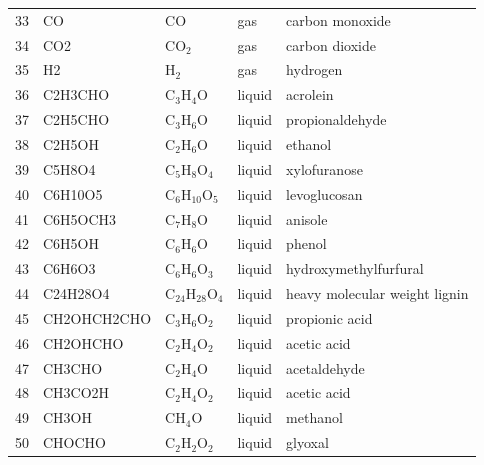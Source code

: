 \begin{center}
\begin{longtable}{cllll}
        33 & CO             & CO                      & \cellcolor{purple!25}gas         & carbon monoxide \\
        34 & CO2            & CO$_2$                  & \cellcolor{purple!25}gas         & carbon dioxide \\
        35 & H2             & H$_2$                   & \cellcolor{purple!25}gas         & hydrogen \\
        36 & C2H3CHO        & C$_3$H$_4$O             & \cellcolor{blue!25}liquid        & acrolein \\
        37 & C2H5CHO        & C$_3$H$_6$O             & \cellcolor{blue!25}liquid        & propionaldehyde \\
        38 & C2H5OH         & C$_2$H$_6$O             & \cellcolor{blue!25}liquid        & ethanol \\
        39 & C5H8O4         & C$_5$H$_8$O$_4$         & \cellcolor{blue!25}liquid        & xylofuranose \\
        40 & C6H10O5        & C$_6$H$_{10}$O$_5$      & \cellcolor{blue!25}liquid        & levoglucosan \\
        41 & C6H5OCH3       & C$_7$H$_8$O             & \cellcolor{blue!25}liquid        & anisole \\
        42 & C6H5OH         & C$_6$H$_6$O             & \cellcolor{blue!25}liquid        & phenol \\
        43 & C6H6O3         & C$_6$H$_6$O$_3$         & \cellcolor{blue!25}liquid        & hydroxymethylfurfural \\
        44 & C24H28O4       & C$_{24}$H$_{28}$O$_4$   & \cellcolor{blue!25}liquid        & heavy molecular weight lignin \\
        45 & CH2OHCH2CHO    & C$_3$H$_6$O$_2$         & \cellcolor{blue!25}liquid        & propionic acid \\
        46 & CH2OHCHO       & C$_2$H$_4$O$_2$         & \cellcolor{blue!25}liquid        & acetic acid \\
        47 & CH3CHO         & C$_2$H$_4$O             & \cellcolor{blue!25}liquid        & acetaldehyde \\
        48 & CH3CO2H        & C$_2$H$_4$O$_2$         & \cellcolor{blue!25}liquid        & acetic acid \\
        49 & CH3OH          & CH$_4$O                 & \cellcolor{blue!25}liquid        & methanol \\
        50 & CHOCHO         & C$_2$H$_2$O$_2$         & \cellcolor{blue!25}liquid        & glyoxal \\

\end{longtable}
\end{center}
